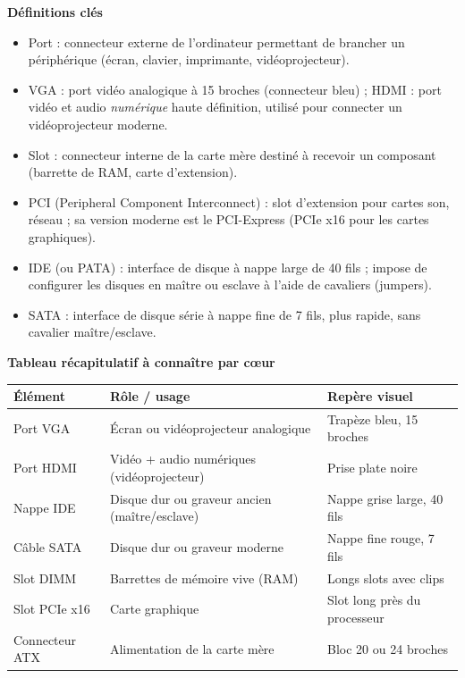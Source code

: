\documentclass[11pt]{article}
\newcommand{\cle}[1]{{\popxbold\color{popdark}#1}}
\begin{document}
\begin{bilan}
\textbf{Définitions clés}
\begin{itemize}
  \item \cle{Port} : connecteur externe de l'ordinateur permettant de brancher un périphérique (écran, clavier, imprimante, vidéoprojecteur).
  \item \cle{VGA} : port vidéo analogique à 15 broches (connecteur bleu) ; \cle{HDMI} : port vidéo et audio \emph{numérique} haute définition, utilisé pour connecter un vidéoprojecteur moderne.
  \item \cle{Slot} : connecteur interne de la carte mère destiné à recevoir un composant (barrette de RAM, carte d'extension).
  \item \cle{PCI} (Peripheral Component Interconnect) : slot d'extension pour cartes son, réseau ; sa version moderne est le \cle{PCI-Express} (PCIe x16 pour les cartes graphiques).
  \item \cle{IDE} (ou PATA) : interface de disque à nappe large de 40 fils ; impose de configurer les disques en \cle{maître} ou \cle{esclave} à l'aide de cavaliers (jumpers).
  \item \cle{SATA} : interface de disque série à nappe fine de 7 fils, plus rapide, sans cavalier maître/esclave.
\end{itemize}

\textbf{Tableau récapitulatif à connaître par cœur}
\begin{center}
\begin{tabularx}{\linewidth}{|l|X|l|}
\hline
\rowcolor{popblueL} \textbf{Élément} & \textbf{Rôle / usage} & \textbf{Repère visuel} \\
\hline
Port VGA & Écran ou vidéoprojecteur analogique & Trapèze bleu, 15 broches \\
\hline
Port HDMI & Vidéo + audio numériques (vidéoprojecteur) & Prise plate noire \\
\hline
Nappe IDE & Disque dur ou graveur ancien (maître/esclave) & Nappe grise large, 40 fils \\
\hline
Câble SATA & Disque dur ou graveur moderne & Nappe fine rouge, 7 fils \\
\hline
Slot DIMM & Barrettes de mémoire vive (RAM) & Longs slots avec clips \\
\hline
Slot PCIe x16 & Carte graphique & Slot long près du processeur \\
\hline
Connecteur ATX & Alimentation de la carte mère & Bloc 20 ou 24 broches \\
\hline
\end{tabularx}
\end{center}


\end{bilan}
\end{document}
